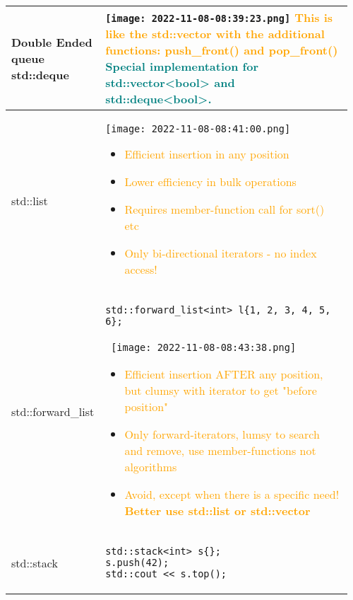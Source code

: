 \documentclass[main.tex,fontsize=8pt,paper=a4,paper=portrait,DIV=calc,]{scrartcl}
\begin{document}
\pagebreak
\begin{table}[ht!]
\begin{tabular}{|m{0.2\linewidth}|m{0.755\linewidth}|}
\hline
Double Ended queue std::deque & 
\vspace{2mm}
\texttt{[image: 2022-11-08-08:39:23.png]}\newline
\textcolor{orange}{This is like the std::vector with the additional functions: \textbf{push\_front() and pop\_front()}}\newline
\textcolor{teal}{Special implementation for std::vector<bool> and std::deque<bool>.}\\
\hline
std::list & 
\vspace{2mm}
\texttt{[image: 2022-11-08-08:41:00.png]}\newline
\begin{itemize}
\item \textcolor{orange}{Efficient insertion in any position}
\item \textcolor{orange}{Lower efficiency in bulk operations}
\item \textcolor{orange}{Requires member-function call for sort() etc}
\item \textcolor{orange}{Only bi-directional iterators - no index access!}
\vspace{-2mm}
\end{itemize}\\
\hline
std::forward\_list & 
\begin{lstlisting}
std::forward_list<int> l{1, 2, 3, 4, 5, 6};
\end{lstlisting}
\, \newline
\texttt{[image: 2022-11-08-08:43:38.png]}\newline
\begin{itemize}
\item \textcolor{orange}{Efficient insertion AFTER any position, but clumsy with iterator to get "before position"}
\item \textcolor{orange}{Only forward-iterators, lumsy to search and remove, use member-functions not algorithms}
\item \textcolor{orange}{Avoid, except when there is a specific need! \textbf{Better use std::list or std::vector}}
\vspace{-2mm}
\end{itemize}\\
\hline
std::stack & 
\begin{lstlisting}
std::stack<int> s{};
s.push(42);
std::cout << s.top();

\end{lstlisting}
\end{tabular}
\end{table}
\end{document}

